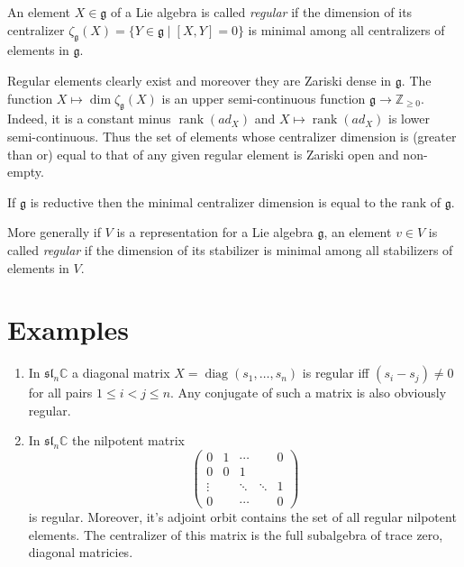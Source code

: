 \documentclass[12pt]{article}
\DeclareMathOperator{\rank}{rank}
\DeclareMathOperator{\diag}{diag}
\begin{document}
An element $X \in \mathfrak{g}$ of a Lie algebra is called \emph{regular} if the dimension of its centralizer $\zeta_{\mathfrak{g}}(X) = \{ Y \in \mathfrak{g} \mid 
[X, Y] = 0 \}$ is minimal among all centralizers of elements in $\mathfrak{g}$.

Regular elements clearly exist and moreover they are Zariski dense in $\mathfrak{g}$. The function $X \mapsto \dim \zeta_{\mathfrak{g}}(X)$ is an upper semi-continuous function $\mathfrak{g} \to \mathbb{Z}_{\ge 0}$. Indeed, it is a constant minus $\rank(ad_X)$ and $X \mapsto \rank(ad_X)$ is lower semi-continuous. Thus the set of elements whose centralizer dimension is (greater than or) equal to that of any given regular element is Zariski open and non-empty.

If $\mathfrak{g}$ is reductive then the minimal centralizer dimension is equal to the rank of $\mathfrak{g}$. 

More generally if $V$ is a representation for a Lie algebra $\mathfrak{g}$,
an element $v \in V$ is called \emph{regular} if the dimension of its stabilizer  is minimal among all stabilizers of elements in $V$.  


\section*{Examples}

\begin{enumerate}
\item In $\mathfrak{sl}_n \mathbb{C}$ a diagonal matrix $X = \diag(s_1, \ldots, s_n)$ is regular iff $(s_i - s_j) \ne 0$ for all pairs $1 \le i < j \le n$. Any conjugate of such a matrix is also obviously regular.

\item In $\mathfrak{sl}_n \mathbb{C}$ the nilpotent matrix
\[ \left( \begin{array}{ccccc} 
0 & 1 & \cdots &  & 0 \\
0 & 0 & 1 & &  \\
\vdots & & \ddots & \ddots & 1 \\
0 & & \cdots & & 0 
\end{array} \right) 
\]
is regular. Moreover, it's adjoint orbit contains the set of all regular nilpotent elements. The centralizer of this matrix is the full subalgebra of
trace zero, diagonal matricies. 
\end{enumerate}
\end{document}
